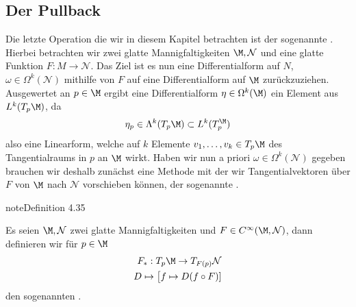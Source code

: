 \documentclass[letterpaper,10pt,german]{jupyterBook}
\begin{document}
\subsection{Der Pullback}
\label{\detokenize{manifolds/diffformen:der-pullback}}
\sphinxAtStartPar
Die letzte Operation die wir in diesem Kapitel betrachten ist der sogenannte . Hierbei betrachten wir zwei glatte Mannigfaltigkeiten \(\M,\mathcal{N}\) und eine glatte Funktion \(F:M\to\mathcal{N}\). Das Ziel ist es nun eine Differentialform auf \(N\), \(\omega\in\Omega^k(\mathcal{N})\) mithilfe von \(F\) auf eine Differentialform auf \(\M\) zurückzuziehen. Ausgewertet an \(p\in\M\) ergibt eine Differentialform \(\eta\in\Omega^k(\M)\) ein Element aus \(L^k(T_p\M)\), da
\begin{equation*}
\begin{split}\eta_p\in \Lambda^k(T_p\M) \subset L^k(T_p^\M)\end{split}
\end{equation*}
\sphinxAtStartPar
also eine Linearform, welche auf \(k\) Elemente \(v_1,\ldots,v_k\in T_p\M\) des Tangentialraums in \(p\) an \(\M\) wirkt. Haben wir nun a priori \(\omega\in\Omega^k(\mathcal{N})\) gegeben brauchen wir deshalb zunächst eine Methode mit der wir Tangentialvektoren über \(F\) von \(\M\) nach \(\mathcal{N}\) vorschieben können, der sogenannte .
\label{manifolds/diffformen:definition-12}
\begin{sphinxadmonition}{note}{Definition 4.35}



\sphinxAtStartPar
Es seien \(\M,\mathcal{N}\) zwei glatte Mannigfaltigkeiten und \(F\in C^\infty(\M,\mathcal{N})\), dann definieren wir für \(p\in\M\)
\begin{equation*}
\begin{split}F_\ast:T_p\M\to T_{F(p)}\mathcal{N}\\
D\mapsto \big[f\mapsto D(f\circ F)]\end{split}
\end{equation*}
\sphinxAtStartPar
den sogenannten .
\end{sphinxadmonition}
\end{document}
